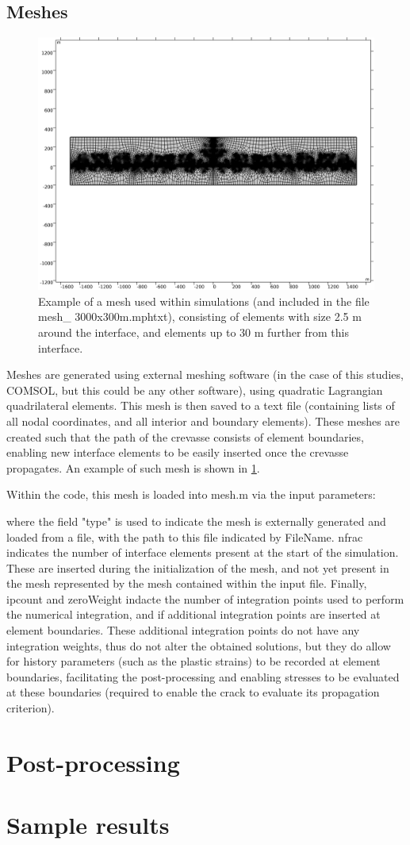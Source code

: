 \documentclass[3p]{elsarticle} %
\begin{document}
\subsection{Meshes}
\begin{figure}
	\centering
	\includegraphics[clip=true, width=12cm, trim={50 200 20 200}]{Figures/mesh.png}
	\caption{Example of a mesh used within simulations (and included in the file mesh\_ 3000x300m.mphtxt), consisting of elements with size 2.5 m around the interface, and elements up to 30 m further from this interface.}
	\label{fig:mesh}
\end{figure}
Meshes are generated using external meshing software (in the case of this studies, COMSOL, but this could be any other software), using quadratic Lagrangian quadrilateral elements. This mesh is then saved to a text file (containing lists of all nodal coordinates, and all interior and boundary elements). These meshes are created such that the path of the crevasse consists of element boundaries, enabling new interface elements to be easily inserted once the crevasse propagates. An example of such mesh is shown in \cref{fig:mesh}. 

Within the code, this mesh is loaded into mesh.m via the input parameters:

where the field "type" is used to indicate the mesh is externally generated and loaded from a file, with the path to this file indicated by FileName. nfrac indicates the number of interface elements present at the start of the simulation. These are inserted during the initialization of the mesh, and not yet present in the mesh represented by the mesh contained within the input file. Finally, ipcount and zeroWeight indacte the number of integration points used to perform the numerical integration, and if additional integration points are inserted at element boundaries. These additional integration points do not have any integration weights, thus do not alter the obtained solutions, but they do allow for history parameters (such as the plastic strains) to be recorded at element boundaries, facilitating the post-processing and enabling stresses to be evaluated at these boundaries (required to enable the crack to evaluate its propagation criterion). 

\section{Post-processing}

\section{Sample results}



\end{document}
